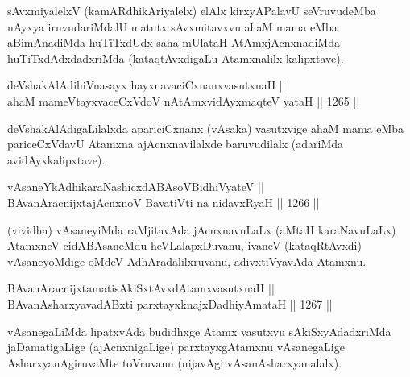 \begin{artha}
sAvxmiyalelxV (kamARdhikAriyalelx) elAlx kirxyAPalavU seVruvudeMba nAyxya iruvudariMdalU matutx sAvxmitavxvu ahaM mama eMba aBimAnadiMda huTiTxdUdx saha mUlataH AtAmxjAcnxnadiMda huTiTxdAdxdadxriMda (kataqtAvxdigaLu Atamxnalilx kalipxtave).
\end{artha}


\begin{shl}
deVshakAlAdihiVnasayx hayxnavaciCxnanxvasutxnaH || \\
ahaM mameVtayxvaceCxVdoV nA\s \s tAmxvidAyxmaqteV yataH \hfill || 1265 ||  
\end{shl}

\begin{artha}
deVshakAlAdigaLilalxda apariciCxnanx (vAsaka) vasutxvige ahaM mama eMba pariceCxVdavU Atamxna ajAcnxnavilalxde baruvudilalx (adariMda avidAyxkalipxtave).
\end{artha}

\begin{shl}
vAsaneYkAdhikaraNashicxdABAsoV\s BidhiVyateV || \\
BAvanAracnijxtajAcnxnoV BavatiVti na nidavxRyaH \hfill || 1266 ||  
\end{shl}

\begin{artha}
(vividha) vAsaneyiMda raMjitavAda jAcnxnavuLaLx (aMtaH karaNavuLaLx) AtamxneV cidABAsaneMdu heVLalapxDuvanu, ivaneV (kataqRtAvxdi) vAsaneyoMdige oMdeV AdhAradalilxruvanu, adivxtiVyavAda Atamxnu.
\end{artha}


\begin{shl}
BAvanAracnijxtamatisAkiSxtAvxdAtamxvasutxnaH || \\
BAvanAsharxyavadABxti parxtayxknajxDadhiyAmataH \hfill || 1267 ||  
\end{shl}

\begin{artha}
vAsanegaLiMda lipatxvAda budidhxge Atamx vasutxvu sAkiSxyAdadxriMda jaDamatigaLige (ajAcnxnigaLige) parxtayxgAtamxnu vAsanegaLige AsharxyanAgiruvaMte toVruvanu (nijavAgi vAsanAsharxyanalalx).
\end{artha}


